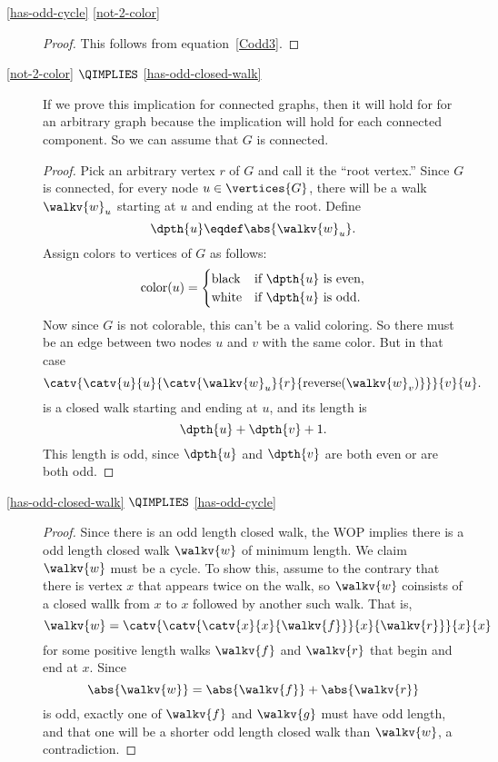 \begin{description}

\item[\ref{has-odd-cycle} \QIMPLIES \ref{not-2-color}]
\begin{proof}
This follows from equation~\ref{Codd3}.
\end{proof}

\item[\ref{not-2-color} $\QIMPLIES$ \ref{has-odd-closed-walk}]

  If we prove this implication for connected graphs, then it will hold for
  for an arbitrary graph because the implication will hold for each
  connected component.  So we can assume that $G$ is connected.
\begin{proof}

  Pick an arbitrary vertex $r$ of $G$ and call it the ``root vertex.''
  Since $G$ is connected, for every node $u \in \vertices{G}$, there will
  be a walk $\walkv{w}_u$ starting at $u$ and ending at the root.  Define
\[
\dpth{u}  \eqdef \abs{\walkv{w}_u}.
\]
Assign colors to vertices of $G$ as follows:
\[
\text{color}(u) = \begin{cases}
                   \text{black} & \text{if $\dpth{u}$ is even},\\
                   \text{white} & \text{if $\dpth{u}$ is odd}.
\end{cases}
\]
Now since $G$ is not colorable, this can't be a valid coloring.  So there
must be an edge between two nodes $u$ and $v$ with the same color.  But in
that case
\[
\catv{\catv{u}{u}{\catv{\walkv{w}_u}{r}{\text{reverse}(\walkv{w}_v)}}}{v}{u}.
\]
is a closed walk starting and ending at $u$, and its length is
\[
\dpth{u} + \dpth{v}+ 1.
\]
This length is odd, since $\dpth{u}$ and $\dpth{v}$ are both even or are both odd.
\end{proof}

\item[\ref{has-odd-closed-walk} $\QIMPLIES$ \ref{has-odd-cycle}]

\begin{proof}
  Since there is an odd length closed walk, the WOP implies there is a odd
  length closed walk $\walkv{w}$ of minimum length.  We claim $\walkv{w}$
  must be a cycle.  To show this, assume to the contrary that there is
  vertex $x$ that appears twice on the walk, so $\walkv{w}$ coinsists of a
  closed wallk from $x$ to $x$ followed by another such walk.  That is,
\[
\walkv{w} = \catv{\catv{\catv{x}{x}{\walkv{f}}}{x}{\walkv{r}}}{x}{x}
\]
for some positive length walks $\walkv{f}$ and $\walkv{r}$ that begin and
end at $x$.  Since
\[
\abs{\walkv{w}} =  \abs{\walkv{f}}+ \abs{\walkv{r}}
\]
is odd, exactly one of $\walkv{f}$ and $\walkv{g}$ must have odd length,
and that one will be a shorter odd length closed walk than $\walkv{w}$, a
contradiction.


\end{proof}
\end{description}
